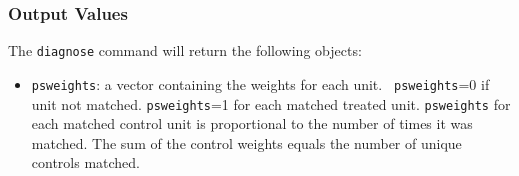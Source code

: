 \documentclass[oneside,letterpaper,titlepage]{article}
\begin{document}
\begin{appendix}
\subsubsection{Output Values}
The \texttt{diagnose} command will return the following objects: 
\begin{itemize}
\item \texttt{psweights}: a vector containing the weights for each unit.  {\tt
    psweights}=0 if unit not matched.  {\tt psweights}=1 for each matched
  treated unit.  {\tt psweights} for each matched control unit is
  proportional to the number of times it was matched.  The sum of the control
  weights equals the number of unique controls matched.
\end{itemize}

\end{appendix}


\clearpage


\end{document}
